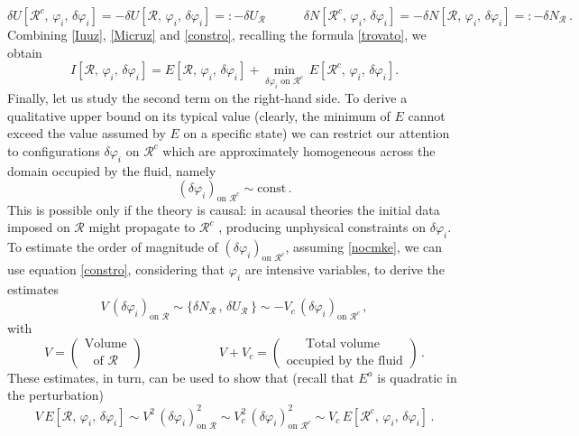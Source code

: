 \documentclass[aps,prl,reprint,nofootinbib]{revtex4-1}
\newcommand{\spc}{\quad \quad \quad}
\begin{document}
\begin{equation}\label{constro}
\delta U[\mathcal{R}^c,\, \varphi_i, \, \delta \varphi_i] = -\delta U [\mathcal{R},\, \varphi_i, \, \delta \varphi_i]=: -\delta U_{\mathcal{R}} \spc \delta N [\mathcal{R}^c,\, \varphi_i, \, \delta \varphi_i] = -\delta N [\mathcal{R},\, \varphi_i, \, \delta \varphi_i]=: - \delta N_{\mathcal{R}} \, .
\end{equation}
Combining \eqref{Iuuz}, \eqref{Micruz} and \eqref{constro}, recalling the formula \eqref{trovato}, we obtain
\begin{equation}\label{IEminE}
I[\mathcal{R},\, \varphi_i, \, \delta \varphi_i] = E[\mathcal{R},\, \varphi_i, \, \delta \varphi_i] + \min_{\delta \varphi_i \text{ on }\mathcal{R}^c} \, E[\mathcal{R}^c,\, \varphi_i, \, \delta \varphi_i].
\end{equation} 
Finally, let us study the second term on the right-hand side. To derive a qualitative upper bound on its typical value (clearly, the minimum of $E$ cannot exceed the value assumed by $E$ on a specific state) we can restrict our attention to configurations $\delta \varphi_i$ on $\mathcal{R}^c$ which are approximately homogeneous across the domain occupied by the fluid, namely 
\begin{equation}\label{nocmke}
(\delta \varphi_i)_{ \text{on }\mathcal{R}^c} \sim \text{const} \, .  
\end{equation}
This is possible only if the theory is causal: in acausal theories the initial data imposed on $\mathcal{R}$ might propagate to $\mathcal{R}^c$ \cite{CourantHilbert1953,Susskind1969,Hishcock1983}, producing unphysical constraints on $\delta \varphi_i$. To estimate the order of magnitude of $(\delta \varphi_i)_{ \text{on }\mathcal{R}^c}$, assuming \eqref{nocmke}, we can use equation \eqref{constro}, considering that $\varphi_i$ are intensive variables, to derive the estimates
\begin{equation}
 V \, (\delta \varphi_i)_{ \text{on }\mathcal{R}}  \sim \{ \delta N_{\mathcal{R}} \, , \, \delta U_{\mathcal{R}} \, \}  \sim - V_c \, (\delta \varphi_i)_{ \text{on }\mathcal{R}^c} \, ,
\end{equation}
with
\begin{equation}
V = \binom{\text{ Volume }}{\text{of }\mathcal{R} } \spc \spc V+ V_c = \binom{\text{Total volume }}{\text{ occupied by the fluid }} \, .
\end{equation}
These estimates, in turn, can be used to show that (recall that $E^a$ is quadratic in the perturbation)
\begin{equation}
V \, E[\mathcal{R},\, \varphi_i, \, \delta \varphi_i] \sim  V^2 \, (\delta \varphi_i)^2_{ \text{on }\mathcal{R}}  \sim V^2_c \, (\delta \varphi_i)^2_{ \text{on }\mathcal{R}^c} \sim V_c \, E[\mathcal{R}^c,\, \varphi_i, \, \delta \varphi_i]\, .
\end{equation}
\end{document}
